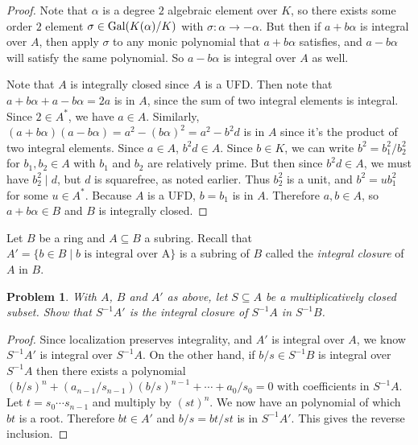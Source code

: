 \documentclass{article}
\newcommand{\Gal}{\textup{Gal}}
\newtheorem{problem}{Problem}
\begin{document}
\begin{proof}
Note that $\alpha$ is a degree $2$ algebraic element over $K$, so there exists some order $2$ element $\sigma \in \Gal(K(\alpha)/K)$ with $\sigma : \alpha \to -\alpha$. But then if $a + b \alpha$ is integral over $A$, then apply $\sigma$ to any monic polynomial that $a + b\alpha$ satisfies, and $a - b\alpha$ will satisfy the same polynomial. So $a - b\alpha$ is integral over $A$ as well.

Note that $A$ is integrally closed since $A$ is a UFD. Then note that $a + b\alpha + a - b\alpha = 2a$ is in $A$, since the sum of two integral elements is integral. Since $2 \in A^*$, we have $a \in A$. Similarly, $(a + b\alpha)(a - b\alpha) = a^2 - (b\alpha)^2 = a^2 - b^2d$ is in $A$ since it's the product of two integral elements. Since $a \in A$, $b^2d \in A$. Since $b \in K$, we can write $b^2 = b_1^2/b_2^2$ for $b_1,b_2 \in A$ with $b_1$ and $b_2$ are relatively prime. But then since $b^2d \in A$, we must have $b_2^2 \mid d$, but $d$ is squarefree, as noted earlier. Thus $b_2^2$ is a unit, and $b^2 = ub_1^2$ for some $u \in A^*$. Because $A$ is a UFD, $b = b_1$ is in $A$. Therefore $a,b \in A$, so $a + b\alpha \in B$ and $B$ is integrally closed.
\end{proof}

\noindent
Let $B$ be a ring and $A \subseteq B$ a subring. Recall that $A' = \{b \in B \mid \text{$b$ is integral over A}\}$ is a subring of $B$ called the \emph{integral closure} of $A$ in $B$.

\begin{problem}
With $A$, $B$ and $A'$ as above, let $S \subseteq A$ be a multiplicatively closed subset. Show that $S^{-1}A'$ is the integral closure of $S^{-1}A$ in $S^{-1}B$.
\end{problem}
\begin{proof}
Since localization preserves integrality, and $A'$ is integral over $A$, we know $S^{-1}A'$ is integral over $S^{-1}A$. On the other hand, if $b/s \in S^{-1}B$ is integral over $S^{-1}A$ then there exists a polynomial $(b/s)^n + (a_{n-1}/s_{n-1})(b/s)^{n-1} + \cdots + a_0/s_0 = 0$ with coefficients in $S^{-1}A$. Let $t = s_0 \cdots s_{n-1}$ and multiply by $(st)^n$. We now have an polynomial of which $bt$ is a root. Therefore $bt \in A'$ and $b/s = bt/st$ is in $S^{-1}A'$. This gives the reverse inclusion.
\end{proof}
\end{document}
